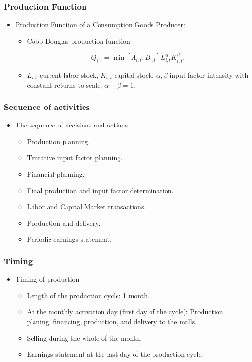 \documentclass{beamer}
\begin{document}
\frame
{
  \frametitle{Production Function} 
\begin{itemize}
	\item Production Function of a Consumption Goods Producer:
	
	
\begin{itemize}
	
	\item Cobb-Douglas production function
	
	\[ Q_{i,t}=  \min \left[A_{i,t},B_{i,t}\right] L_{i,t}^{\alpha}K_{i,t}^{\beta}.\]
	
	\item $ L_{i,t}$ current labor stock, $ K_{i,t}$ capital stock, $\alpha, \beta$ input factor intensity with constant returns to scale, $\alpha + \beta =1$.

\end{itemize}

	\end{itemize}


}


\frame
{
  \frametitle{Sequence of activities} 


\begin{itemize}
	\item The sequence of decisions and actions
	\begin{itemize}
	\item Production planning.
	\item Tentative input factor planning.
	\item Financial planning.
	\item Final production and input factor determination.
	\item Labor and Capital Market transactions.
	\item Production and delivery.
	\item Periodic earnings statement.
	 
	\end{itemize}
	
	\end{itemize}


}

\frame
{
  \frametitle{Timing} 
  
  \begin{itemize}	
	\item Timing of production
	
\begin{itemize}
	\item Length of the production cycle: 1 month. 
	\item At the monthly activation day (first day of the cycle): Production planing, financing, production, and delivery to the malls.
	\item Selling during the whole of the month.
	\item Earnings statement at the last day of the production cycle.
\end{itemize}
\end{itemize}


}
\end{document}
